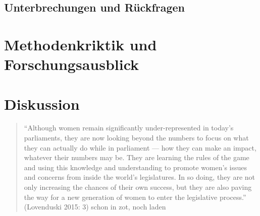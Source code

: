 \documentclass[12pt, 
    twoside=false, 
    bibliography=totoc, 
    numbers=endperiod, 
    headings=normal, 
    toc=chapterentrydotfill
    ]{scrbook}
\begin{document}
\section{Unterbrechungen und Rückfragen}

\chapter{Methodenkriktik und Forschungsausblick}

\chapter{Diskussion}

\begin{quote}
    
\enquote{Although women remain significantly under-represented in today’s parliaments, they are now looking beyond the numbers to focus on what they can actually do while in parliament — how they can make an impact, whatever their numbers may be. They are learning the rules of the game and using this knowledge and understanding to promote women’s issues and concerns from inside the world’s legislatures. In so doing, they are not only increasing the chances of their own success, but they are also paving the way for a new generation of women to enter the legislative process.}  (Lovenduski 2015: 3) schon in zot, noch laden 
\end{quote}

\printbibliography[title={Literaturverzeichnis}]
\end{document}

